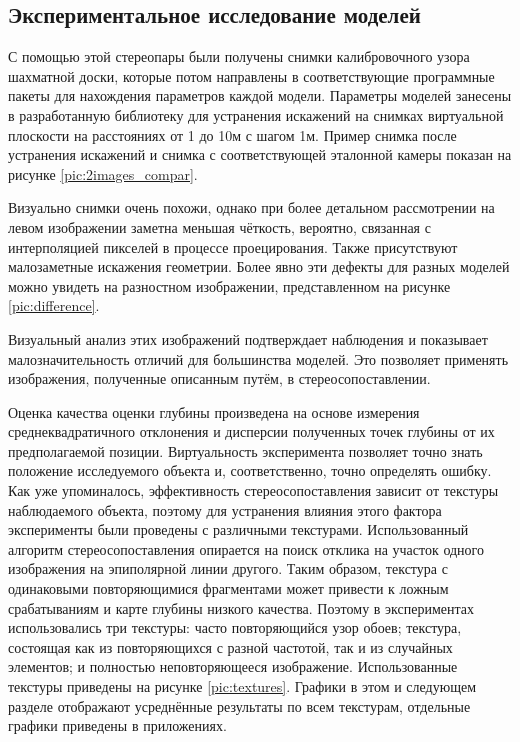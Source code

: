 \subsection{Экспериментальное исследование моделей}
\label{model_exps}

С помощью этой стереопары были получены снимки калибровочного узора шахматной доски, 
которые потом  направлены в соответствующие программные пакеты для нахождения параметров каждой модели. 
Параметры моделей занесены в разработанную библиотеку для устранения искажений на снимках виртуальной 
плоскости на расстояниях от 1 до 10м с шагом 1м. 
Пример снимка после устранения искажений и снимка с соответствующей эталонной камеры показан на рисунке \ref{pic:2images_compar}.


Визуально снимки очень похожи, однако при более детальном рассмотрении на левом изображении заметна меньшая чёткость,
вероятно, связанная с интерполяцией пикселей в процессе проецирования. Также присутствуют малозаметные искажения геометрии. Более 
явно эти дефекты для разных моделей можно увидеть на разностном изображении, представленном на рисунке \ref{pic:difference}. 


Визуальный анализ этих изображений подтверждает наблюдения и показывает малозначительность отличий для большинства моделей. 
Это позволяет применять изображения, полученные описанным путём, в стереосопоставлении. 

Оценка качества оценки глубины произведена на основе измерения среднеквадратичного отклонения и дисперсии полученных точек 
глубины от их предполагаемой позиции. Виртуальность эксперимента позволяет точно знать положение исследуемого объекта и, соответственно, 
точно определять ошибку. Как уже упоминалось, эффективность стереосопоставления \cite{SGBM} зависит от текстуры наблюдаемого объекта, 
поэтому для устранения влияния этого фактора эксперименты были проведены с различными текстурами. Использованный алгоритм стереосопоставления
опирается на поиск отклика на участок одного изображения на эпиполярной линии другого. Таким образом, текстура с одинаковыми повторяющимися 
фрагментами может привести к ложным срабатываниям и карте глубины низкого качества. Поэтому в экспериментах использовались три текстуры: часто 
повторяющийся узор обоев; текстура, состоящая как из повторяющихся с разной частотой, так и из случайных элементов; и полностью неповторяющееся изображение.
Использованные текстуры приведены на рисунке \ref{pic:textures}. Графики в этом и следующем разделе отображают усреднённые результаты по всем текстурам, отдельные графики приведены в приложениях. 

